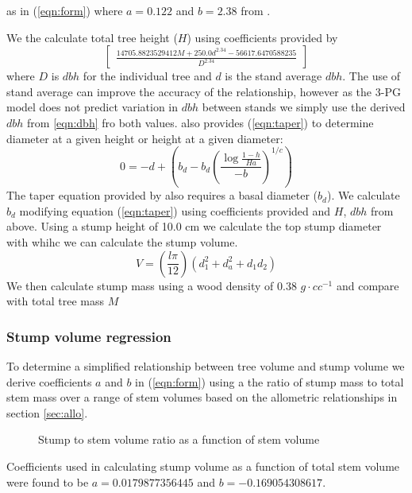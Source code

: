 \documentclass[10pt]{article}
\begin{document}
as in (\ref{eqn:form}) where $a=0.122$ and $b=2.38$ from \cite{Landsberg1997}.

We the calculate total tree height ($H$) using coefficients provided by \cite{Brahim2000}
\begin{equation}
    \label{eqn:height}
    \begin{bmatrix}\frac{14705.8823529412 M + 250.0 d^{2.34} -56617.6470588235}{D^{2.34}}\end{bmatrix}
    \end{equation}where $D$ is $dbh$ for the individual tree and $d$ is the stand average $dbh$. The use of stand average can improve the accuracy of the relationship, however as the 3-PG model does not predict variation in $dbh$ between stands we simply use the derived $dbh$ from \ref{eqn:dbh} fro both values. \cite{Benbrahim2003} also provides (\ref{eqn:taper}) to determine diameter at a given height or height at a given diameter:
\begin{equation}
    \label{eqn:taper}
    0=-d+\left(b_d-b_d\left(\frac{\log{\frac{1-h}{Ha}}}{-b}\right)^{1/c}\right)
    \end{equation}The taper equation provided by \cite{Benbrahim2003} also requires a basal diameter ($b_d$). We calculate $b_d$ modifying equation (\ref{eqn:taper}) using coefficients provided and $H$, $dbh$ from above. Using a stump height of 10.0 cm we calculate the top stump diameter with whihc we can calculate the stump volume.
\begin{equation}
    \label{eqn:sectionvolume}
    V=\left(\frac{l\pi}{12}\right)(d_1^2+d_a^2+d_1d_2)
    \end{equation}We then calculate stump mass using a wood density of 0.38 $g \cdot cc^{-1}$ and compare with total tree mass $M$
\subsubsection*{Stump volume regression}
To determine a simplified relationship between tree volume and stump volume we derive coefficients $a$ and $b$ in (\ref{eqn:form}) using a the ratio of stump mass to total stem mass over a range of stem volumes based on the allometric relationships in section \ref{sec:allo}.\begin{figure}[h]
     \centering
    \caption{Stump to stem volume ratio as a function of stem volume}
    \label{fig:stump_vol}
    \end{figure}
Coefficients used in calculating stump volume as a function of total stem volume were found to be $a=0.0179877356445$ and $b=-0.169054308617$.
\end{document}
